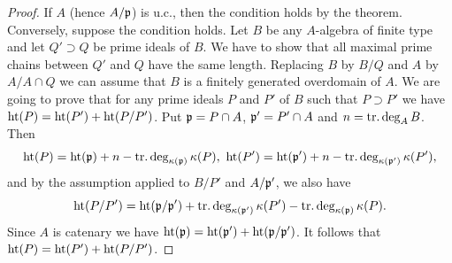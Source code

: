 \documentclass[../main]{subfiles}
\begin{document}
\begin{proof}
If $A$ (hence $A /\mathfrak{p}$) is u.c., then the condition holds by the theorem. Conversely, suppose the condition holds. Let $B$ be any $A$-algebra of finite type and let $Q'\supset Q$ be prime ideals of $B$. We have to show that all maximal prime chains between $Q'$ and $Q$ have the same length. Replacing $B$ by $B/Q$ and $A$ by $A/A\cap Q$ we can assume that $B$ is a finitely generated overdomain of $A$. We are going to prove that for any prime ideals $P$ and $P'$ of $B$ such that $P \supset P'$ we have $\operatorname{ht}(P)=\operatorname{ht}(P')+\operatorname{ht}(P/P')$. Put $\mathfrak{p}=P\cap A$, $\mathfrak{p}'=P'\cap A$ and $n=\operatorname{tr. deg}_AB$. Then \[\operatorname{ht}(P)=\operatorname{ht}(\mathfrak{p})+n-\operatorname{tr. deg}_{\kappa(\mathfrak{p})}\kappa(P),\,\, \operatorname{ht}(P')=\operatorname{ht}(\mathfrak{p}')+n-\operatorname{tr. deg}_{\kappa(\mathfrak{p}')}\kappa(P'),\] and by the assumption applied to $B/P'$ and $A / \mathfrak{p}'$, we also have \[\operatorname{ht}(P / P')=\operatorname{ht}(\mathfrak{p}/\mathfrak{p}')+\operatorname{tr. deg}_{\kappa(\mathfrak{p}')}\kappa(P')-\operatorname{tr. deg}_{\kappa(\mathfrak{p})}\kappa(P).\] Since $A$ is catenary we have $\operatorname{ht}(\mathfrak{p})=\operatorname{ht}(\mathfrak{p}')+\operatorname{ht}(\mathfrak{p} / \mathfrak{p}')$. It follows that \newline $\operatorname{ht}(P)=\operatorname{ht}(P')+\operatorname{ht}(P / P')$.
\end{proof}
\end{document}
